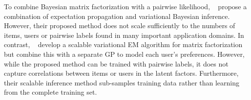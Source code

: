 To combine Bayesian matrix factorization with a pairwise likelihood,
~\citet{houlsby2012collaborative} propose a combination of expectation propagation and variational Bayesian inference.
However, their proposed method does not scale sufficiently to the numbers of 
items, users or pairwise labels found in many important application domains. 
In contrast, ~\citet{khan2014scalable} develop a scalable variational EM algorithm
for matrix factorization but combine this with a separate GP to model each user's preferences. 
However, while the proposed method can be trained with pairwise labels, 
it does not capture correlations between items or users in the latent factors.
Furthermore, their scalable inference method sub-samples training data rather than learning from the complete training set.

